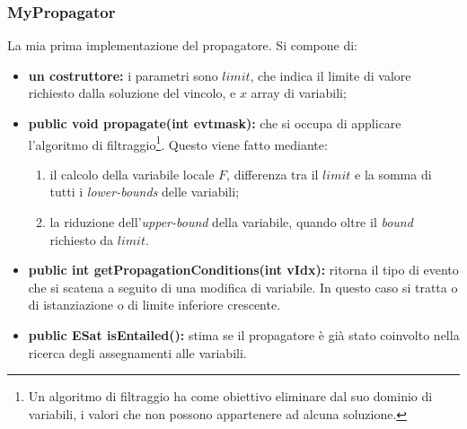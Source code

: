 \subsubsection{MyPropagator}
La mia prima implementazione del propagatore. Si compone di:
\begin{itemize}
\item \textbf{un costruttore:} i parametri sono $limit$, che indica il limite di valore richiesto dalla soluzione del vincolo, e $x$ array di variabili;
\item  \textbf{public void propagate(int evtmask):} che si occupa di applicare l'algoritmo di filtraggio\footnote{Un algoritmo di filtraggio ha come obiettivo eliminare dal suo dominio di variabili, i valori che non possono appartenere ad alcuna soluzione.}. Questo viene fatto mediante:
\begin{enumerate}
\item il calcolo della variabile locale $F$, differenza tra il $limit$ e la somma di tutti i \textit{lower-bounds} delle variabili;
\item la riduzione dell'\textit{upper-bound} della variabile, quando oltre il \textit{bound} richiesto da $limit$.
\end{enumerate}
\item \textbf{public int getPropagationConditions(int vIdx):} ritorna il tipo di evento che si scatena a seguito di una modifica di variabile. In questo caso si tratta o di istanziazione o di limite inferiore crescente.
\item \textbf{public ESat isEntailed():} stima se il propagatore \`e gi\`a stato coinvolto nella ricerca degli assegnamenti alle variabili.
\end{itemize}

